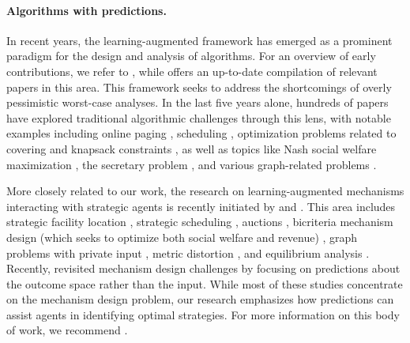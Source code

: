 \paragraph{Algorithms with predictions.} In recent years, the learning-aug\-mented framework has emerged as a prominent paradigm for the design and analysis of algorithms. For an overview of early contributions, we refer to \citep{MV22}, while \citep{alps} offers an up-to-date compilation of relevant papers in this area. This framework seeks to address the shortcomings of overly pessimistic worst-case analyses. In the last five years alone, hundreds of papers have explored traditional algorithmic challenges through this lens, with notable examples including online paging \citep{lykouris2018competitive}, scheduling \citep{PSK18}, optimization problems related to covering \citep{BMS20} and knapsack constraints \citep{IKQP21}, as well as topics like Nash social welfare maximization \citep{banerjee2020online}, the secretary problem \citep{AGKK23, DLLV21, KY23}, and various graph-related problems \citep{azar2022online}.

More closely related to our work, the research on learning-aug\-mented mechanisms interacting with strategic agents is recently initiated by \citet{ABGOT22} and \citet{XL22}. This area includes strategic facility location \citep{ABGOT22, XL22, IB22, BGT24}, strategic scheduling \citep{XL22, BGT223}, auctions \citep{MV17, XL22, LuWanZhang23, caragiannis2024randomized, BGTZ23}, bicriteria mechanism design (which seeks to optimize both social welfare and revenue) \citep{BPS23}, graph problems with private input \citep{CKST24}, metric distortion \citep{BFGT23}, and equilibrium analysis \citep{GKST22, IBB24}. Recently, \citet{CSV24} revisited mechanism design challenges by focusing on predictions about the outcome space rather than the input. While most of these studies concentrate on the mechanism design problem, our research emphasizes how predictions can assist agents in identifying optimal strategies.  For more information on this body of work, we recommend \citep{BGT23}.
